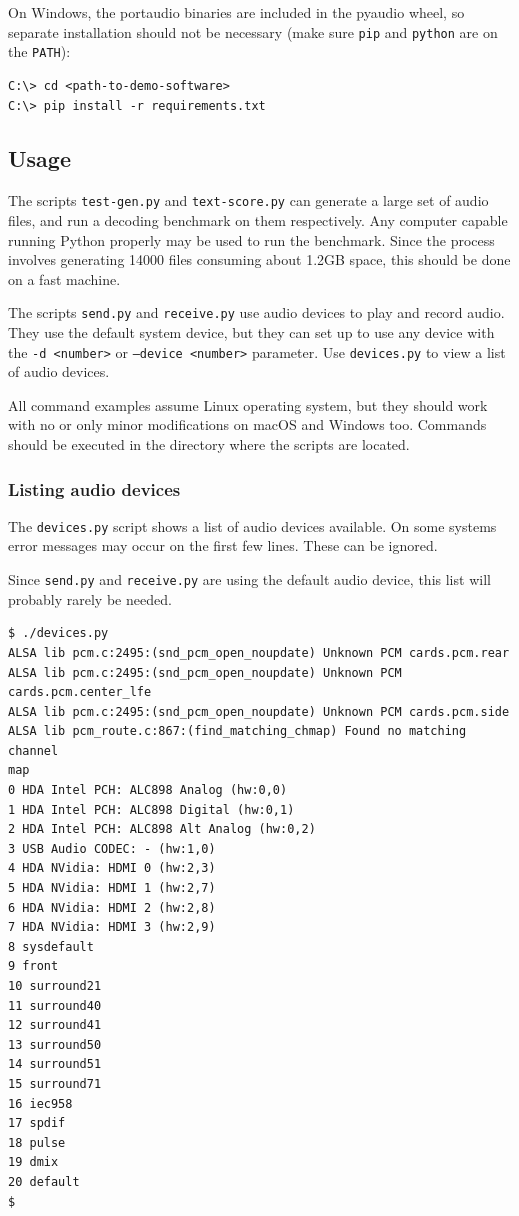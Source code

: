 \documentclass[a4paper]{article}
\begin{document}
On Windows, the portaudio binaries are included in the pyaudio wheel, 
so separate installation should not be necessary (make sure 
\texttt{pip} and \texttt{python} are on the \texttt{PATH}):

\begin{lstlisting}
C:\> cd <path-to-demo-software>
C:\> pip install -r requirements.txt
\end{lstlisting}

\subsection{Usage}

The scripts \texttt{test-gen.py} and \texttt{text-score.py} can 
generate a large set of audio files, and run a decoding benchmark on 
them respectively. Any computer capable running Python properly may be 
used to run the benchmark. Since the process involves generating 14000 
files consuming about 1.2GB space, this should be done on a fast 
machine.

The scripts \texttt{send.py} and \texttt{receive.py} use audio devices 
to play and record audio. They use the default system device, but they 
can set up to use any device with the \texttt{-d <number>} or 
\texttt{--device <number>} parameter. Use \texttt{devices.py} to view a 
list of audio devices.

All command examples assume Linux operating system, but they should 
work with no or only minor modifications on macOS and Windows too. 
Commands should be executed in the directory where the scripts are 
located.

\subsubsection{Listing audio devices}

The \texttt{devices.py} script shows a list of audio devices available. 
On some systems error messages may occur on the first few lines. These 
can be ignored.

Since \texttt{send.py} and \texttt{receive.py} are using the default 
audio device, this list will probably rarely be needed.

\begin{lstlisting}
$ ./devices.py 
ALSA lib pcm.c:2495:(snd_pcm_open_noupdate) Unknown PCM cards.pcm.rear
ALSA lib pcm.c:2495:(snd_pcm_open_noupdate) Unknown PCM
cards.pcm.center_lfe
ALSA lib pcm.c:2495:(snd_pcm_open_noupdate) Unknown PCM cards.pcm.side
ALSA lib pcm_route.c:867:(find_matching_chmap) Found no matching channel
map
0 HDA Intel PCH: ALC898 Analog (hw:0,0)
1 HDA Intel PCH: ALC898 Digital (hw:0,1)
2 HDA Intel PCH: ALC898 Alt Analog (hw:0,2)
3 USB Audio CODEC: - (hw:1,0)
4 HDA NVidia: HDMI 0 (hw:2,3)
5 HDA NVidia: HDMI 1 (hw:2,7)
6 HDA NVidia: HDMI 2 (hw:2,8)
7 HDA NVidia: HDMI 3 (hw:2,9)
8 sysdefault
9 front
10 surround21
11 surround40
12 surround41
13 surround50
14 surround51
15 surround71
16 iec958
17 spdif
18 pulse
19 dmix
20 default
$
\end{lstlisting}
\end{document}
